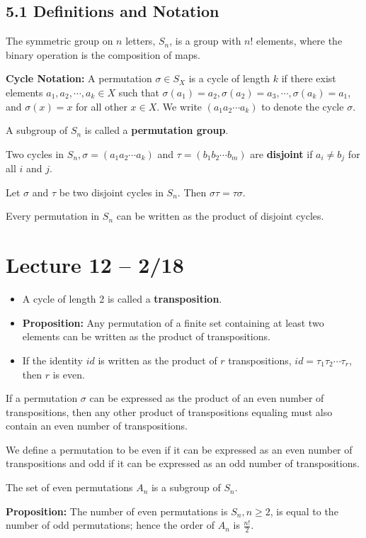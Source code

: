 \documentclass{article}
\begin{document}
\subsection{5.1 Definitions and Notation}
\begin{theorem}
  The symmetric group on $n$ letters, $S_n$, is a group with $n!$ elements, where the binary operation is the composition of maps.
\end{theorem}
\textbf{Cycle Notation:} A permutation $\sigma\in S_X$ is a cycle of length $k$ if there exist elements $a_1, a_2, \cdots, a_k\in X$ such that $\sigma(a_1)=a_2, \sigma(a_2)=a_3, \cdots, \sigma(a_k)=a_1$, and $\sigma(x)=x$ for all other $x\in X$. We write $(a_1a_2\cdots a_k)$ to denote the cycle $\sigma$.

A subgroup of $S_n$ is called a \textbf{permutation group}.

Two cycles in $S_n, \sigma=(a_1a_2\cdots a_k)$ and $\tau=(b_1b_2\cdots b_m)$ are \textbf{disjoint} if $a_i\neq b_j$ for all $i$ and $j$.

Let $\sigma$ and $\tau$ be two disjoint cycles in $S_n$. Then $\sigma\tau=\tau\sigma$.

Every permutation in $S_n$ can be written as the product of disjoint cycles.

\section{Lecture 12 -- 2/18}
\begin{itemize}
  \item A cycle of length 2 is called a \textbf{transposition}.
  \item \textbf{Proposition:} Any permutation of a finite set containing at least two elements can be written as the product of transpositions.
  \item If the identity $id$ is written as the product of $r$ transpositions, $id=\tau_1\tau_2\cdots\tau_r$, then $r$ is even.
\end{itemize}
\begin{theorem}
  If a permutation $\sigma$ can be expressed as the product of an even number of transpositions, then any other product of transpositions equaling must also contain an even number of transpositions.

  We define a permutation to be even if it can be expressed as an even number of transpositions and odd if it can be expressed as an odd number of transpositions.
\end{theorem}
\begin{theorem}
  The set of even permutations $A_n$ is a subgroup of $S_n$.
\end{theorem}
\textbf{Proposition:} The number of even permutations is $S_n, n\geq2$, is equal to the number of odd permutations; hence the order of $A_n$ is $\frac{n!}{2}.$
\end{document}
